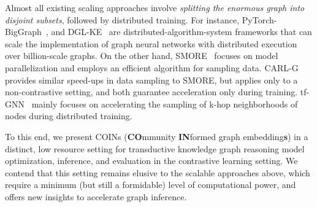 

Almost all existing scaling approaches involve \emph{splitting the enormous graph into disjoint subsets}, followed by distributed training.
For instance, PyTorch-BigGraph~\cite{lerer_pytorch-biggraph_2019}, and DGL-KE~\cite{zheng_dgl-ke_2020} are distributed-algorithm-system frameworks that can scale the implementation of graph neural networks with distributed execution over billion-scale graphs.
On the other hand, SMORE~\cite{ren_smore_2021} focuses on model parallelization and employs an efficient algorithm for sampling data. CARL-G~\cite{shiao_carl-g_2023} provides similar speed-ups in data sampling to SMORE, but applies only to a non-contrastive setting, and both guarantee acceleration only during training. tf-GNN~\cite{ferludin_tf-gnn_2022} mainly focuses on accelerating the sampling of k-hop neighborhoods of nodes during distributed training.

To this end, we present COINs ({\bf CO}mmunity {\bf IN}formed graph embedding{\bf s}) in a distinct, low resource setting for transductive knowledge graph reasoning model optimization, inference, and evaluation in the contrastive learning setting. We contend that this setting remains elusive to the scalable approaches above, which require a minimum (but still a formidable) level of computational power, and offers new insights to accelerate graph inference. 


